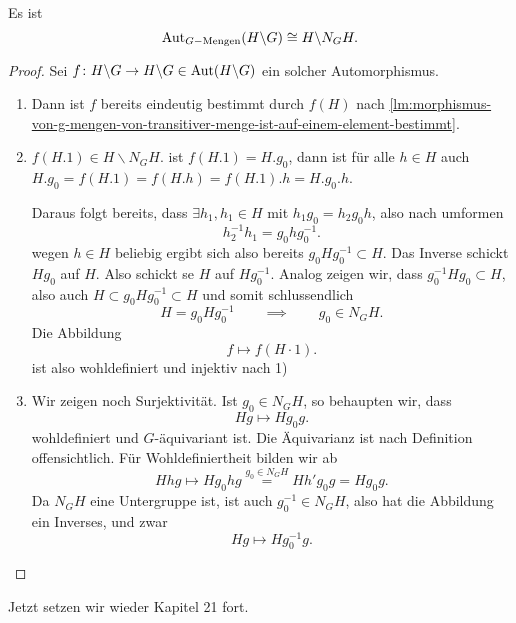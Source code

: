 \begin{proposition}
    Es ist
    \[
        \operatorname{Aut}_{G-\text{Mengen}}(H \backslash G) \cong H \backslash N_GH
    .\] 
\end{proposition}
\begin{proof}
    Sei $f\colon  H \backslash G \to  H \backslash G\in \operatorname{Aut} (H \backslash G)$ ein solcher Automorphismus.
    \begin{enumerate}[1)]
    \item Dann ist $f$ bereits eindeutig bestimmt durch  $f(H)$ nach \autoref{lm:morphismus-von-g-mengen-von-transitiver-menge-ist-auf-einem-element-bestimmt}.
    \item $f(H.1) \in H \backslash N_GH$. ist $f(H.1) = H.g_0$, dann ist für alle $h\in H$ auch $H.g_0 = f(H.1) = f(H.h) = f(H.1).h = H.g_0.h$.

        Daraus folgt bereits, dass $\exists h_1,h_1 \in H$ mit $h_1g_0 = h_2g_0h$, also nach umformen
        \[
       h_2^{-1}h_1 = g_0hg_0^{-1}
        .\] 
        wegen $h\in H$ beliebig ergibt sich also bereits $g_0Hg_0^{-1}\subset H$. Das Inverse schickt $Hg_0$ auf $H$. Also schickt se  $H$ auf  $Hg_0^{-1}$. Analog zeigen wir, dass $g_0^{-1}Hg_0 \subset H$, also auch $H\subset g_0Hg_0^{-1}\subset H$ und somit schlussendlich
        \[
        H = g_0Hg_0^{-1} \qquad \implies \qquad g_0\in N_GH
        .\] 
        Die Abbildung
        \[
            f \mapsto f(H\cdot 1)
        .\] 
        ist also wohldefiniert und injektiv nach 1)

    \item Wir zeigen noch Surjektivität. Ist $g_0\in N_GH$, so behaupten wir, dass
        \[
        Hg \mapsto Hg_0g
        .\] 
        wohldefiniert und $G$-äquivariant ist. Die Äquivarianz ist nach Definition offensichtlich. Für Wohldefiniertheit bilden wir ab
         \[
             Hhg \mapsto H g_0hg \stackrel{g_0\in N_GH}{=} H h'g_0g = Hg_0g
        .\] 
        Da $N_GH$ eine Untergruppe ist, ist auch  $g_0^{-1}\in N_GH$, also hat die Abbildung ein Inverses, und zwar
        \[
        Hg \mapsto Hg_0^{-1}g
        .\] 
\end{enumerate}
\end{proof}


\setcounter{section}{21}
\setcounter{mkessler@fancythm@dummy}{4}
\setcounter{mkessler@fancythm@smalldummy}{11}


\begin{remark*}
    Jetzt setzen wir wieder Kapitel 21 fort.
\end{remark*}


